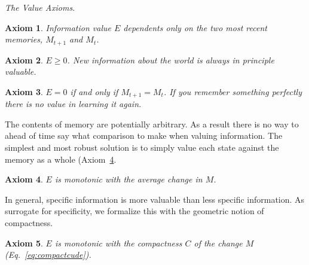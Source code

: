 \documentclass[9pt,twocolumn,twoside]{pnas-new}
\newtheorem{axiom}{Axiom}
\begin{document}
\center \textit{The Value Axioms}.
\begin{axiom} 
    Information value $E$ dependents only on the two most recent memories, $M_{t+1}$ and $M_{t}$.
    \label{ax:1}
\end{axiom} 

\begin{axiom}
    $E \geq 0$. New information about the world is always \textit{in principle} valuable.
    \label{ax:2}
\end{axiom}

\begin{axiom}
    $E = 0$ if and only if $M_{t+1} = M_{t}$. If you remember something perfectly there is no value in learning it again. 
    \label{ax:3}
\end{axiom}

\noindent
The contents of memory are potentially arbitrary. As a result there is no way to ahead of time say what comparison to make when valuing information. The simplest and most robust solution is to simply value each state against the memory as a whole (Axiom~\ref{ax:4}. 
\begin{axiom}
    $E$ is monotonic with the average change in $M$.
    \label{ax:4}
\end{axiom}

\noindent
In general, specific information is more valuable than less specific information. As surrogate for specificity, we formalize this with the geometric notion of compactness.
\begin{axiom}
    $E$ is monotonic with the compactness $C$ of the change $M$ (Eq.~\ref{eq:compactcude}).
    \label{ax:5}
\end{axiom}
\noindent




\end{document}
